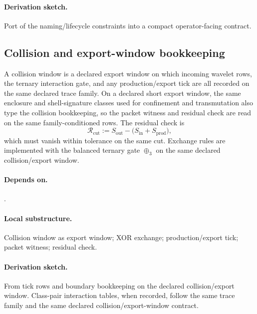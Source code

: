\paragraph{Derivation sketch.} Port of the naming/lifecycle constraints into a compact operator-facing contract.

\subsection{Collision and export-window bookkeeping}\label{subsec:collision-export-calculus}
\begin{definition}
\label{def:collision-export-operator}
A collision window is a declared export window on which incoming wavelet rows, the ternary interaction gate, and any production/export tick are all recorded on the same declared trace family. On a declared short export window, the same enclosure and shell-signature classes used for confinement and transmutation also type the collision bookkeeping, so the packet witness and residual check are read on the same family-conditioned rows. The residual check is
\[
\mathcal R_{\mathrm{cut}}:=S_{\mathrm{out}}-\bigl(S_{\mathrm{in}}+S_{\mathrm{prod}}\bigr),
\]
which must vanish within tolerance on the same cut. Exchange rules are implemented with the balanced ternary gate $\oplus_3$ on the same declared collision/export window.
\end{definition}

\paragraph{Depends on.} .
\paragraph{Local substructure.} Collision window as export window; XOR exchange; production/export tick; packet witness; residual check.
\paragraph{Derivation sketch.} From tick rows and boundary bookkeeping on the declared collision/export window. Class-pair interaction tables, when recorded, follow the same trace family and the same declared collision/export-window contract.
